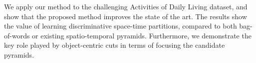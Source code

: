 %


We apply our method to the challenging Activities of Daily Living dataset, and show that the proposed method improves the state of the art.  The results show the value of learning discriminative space-time partitions, compared to both bag-of-words or existing spatio-temporal pyramids.  Furthermore, we demonstrate the key role played by object-centric cuts in terms of focusing the candidate pyramids.

